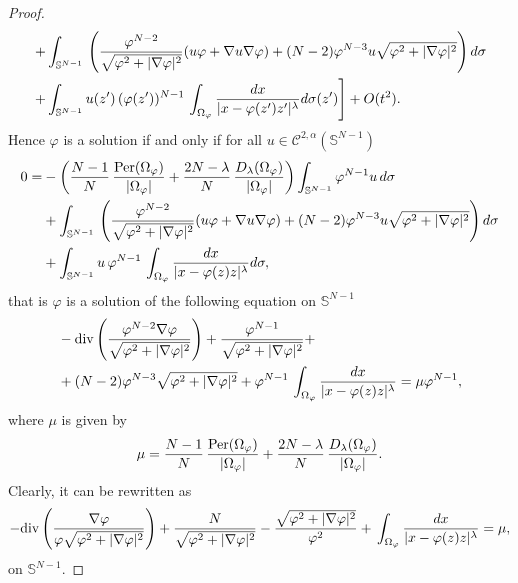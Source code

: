 \documentclass[10pt,a4paper]{amsart}
\newcommand{\Sn}{\mathbb{S}^{N-1}}
\begin{document}
\begin{proof}
\[\begin{aligned}
&\left.
  + \int_{\mathbb S^{N-1}} \, \left( {\varphi^{N-2} \over  \sqrt{ \varphi^2 + |\nabla \varphi|^2}} (u \varphi + \nabla u \nabla \varphi) + (N-2) \varphi^{N-3} u  \sqrt{ \varphi^2 + |\nabla \varphi|^2}\right) d \sigma\right.\\
&\left.+\int_{\mathbb S^{N-1}}  u(z') \, (\varphi (z'))^{N-1} \,  \int_{\Omega_\varphi}    {  d x\over |x - \varphi (z')   z'|^\lambda} d \sigma (z')  \right]+O(t^2).
\end{aligned}
\]
Hence $\varphi$ is a solution if and only if for all $u\in\mathcal C^{2,\alpha}(\Sn)$
\begin{align*}
 0= &-\left( {N-1 \over N} \, {{\mbox {Per}} (\Omega_{\varphi }) \over  |\Omega_\varphi |} +{2N-\lambda \over N} \,\frac{D_\lambda(\Omega_\varphi) }{|\Omega_\varphi |}\right)\int_{\mathbb S^{N-1}} \varphi^{N-1} u \,d\sigma\\
  &+
   \int_{\mathbb S^{N-1}} \, \left( {\varphi^{N-2} \over  \sqrt{ \varphi^2 + |\nabla \varphi|^2}} (u \varphi + \nabla u \nabla \varphi) + (N-2) \varphi^{N-3} u  \sqrt{ \varphi^2 + |\nabla \varphi|^2}\right) d \sigma\\
   &+\int_{\mathbb S^{N-1}}  u\,\varphi^{N-1} \,  \int_{\Omega_\varphi}    {  d x\over |x - \varphi  (z)  z|^\lambda} d \sigma,
\end{align*}
that is $\varphi$ is a solution of the following equation on $\mathbb S^{N-1}$
\[
\begin{split}
    &-\mathrm{div}\left(\frac{\varphi^{N-2}\nabla\varphi}{\sqrt{ \varphi^2 + |\nabla \varphi|^2}}\right)+\frac{\varphi^{N-1}}{\sqrt{ \varphi^2 + |\nabla \varphi|^2}}+\\
    &+(N-2)\varphi^{N-3}\sqrt{ \varphi^2 + |\nabla \varphi|^2}+\varphi^{N-1} \,  \int_{\Omega_\varphi}    {  d x\over |x - \varphi (z)   z|^\lambda}=\mu \varphi^{N-1},
\end{split}
\]
where $\mu$ is given by
\[
\mu= {N-1 \over N} \, {{\mbox {Per}} (\Omega_{\varphi }) \over  |\Omega_\varphi |} +{2N-\lambda \over N} \,\frac{D_\lambda(\Omega_\varphi) }{|\Omega_\varphi |}.
\]
Clearly, it can be rewritten as
\[
-\mathrm{div}\left(\frac{\nabla\varphi}{\varphi\sqrt{ \varphi^2 + |\nabla \varphi|^2}}\right)+\frac{N}{\sqrt{ \varphi^2 + |\nabla \varphi|^2}}-\frac{\sqrt{ \varphi^2 + |\nabla \varphi|^2}}{\varphi^2}+ \,  \int_{\Omega_\varphi}    {  d x\over |x - \varphi (z)   z|^\lambda}=\mu ,
\]
 on $\mathbb S^{N-1}$.
\end{proof}
\end{document}
